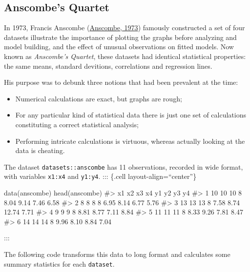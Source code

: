 \documentclass[
  letterpaper,
  10pt,
  krantz2]{krantz}
\makeatletter
\newenvironment{Shaded}{\begin{snugshade}}{\end{snugshade}}
\newcommand{\CommentTok}[1]{\textcolor[rgb]{0.37,0.37,0.37}{#1}}
\newcommand{\FunctionTok}[1]{\textcolor[rgb]{0.28,0.35,0.67}{#1}}
\newcommand{\NormalTok}[1]{\textcolor[rgb]{0.00,0.23,0.31}{#1}}
\providecommand{\tightlist}{%
  \setlength{\itemsep}{0pt}\setlength{\parskip}{0pt}}\usepackage{longtable,booktabs,array}
\newenvironment{kframe}{%
  \medskip{}
  \setlength{\fboxsep}{.8em}
  \def\at@end@of@kframe{}%
  \ifinner\ifhmode%
  \def\at@end@of@kframe{\end{minipage}}%
  \begin{minipage}{\columnwidth}%
  \fi\fi%
  \def\FrameCommand##1{\hskip\@totalleftmargin \hskip-\fboxsep
  \colorbox{shadecolor}{##1}\hskip-\fboxsep
      \hskip-\linewidth \hskip-\@totalleftmargin \hskip\columnwidth}%
  \MakeFramed {\advance\hsize-\width
    \@totalleftmargin\z@ \linewidth\hsize
    \@setminipage}}%
{\par\unskip\endMakeFramed%
  \at@end@of@kframe}
\renewenvironment{Shaded}{\begin{kframe}}{\end{kframe}}
\makeatother
\begin{document}
\hypertarget{sec-anscombe}{%
\subsection{Anscombe's Quartet}\label{sec-anscombe}}

In 1973, Francis Anscombe (\protect\hyperlink{ref-Anscombe:73}{Anscombe,
1973}) famously constructed a set of four datasets illustrate the
importance of plotting the graphs before analyzing and model building,
and the effect of unusual observations on fitted models. Now known as
\emph{Anscombe's Quartet}, these datasets had identical statistical
properties: the same means, standard devitions, correlations and
regression lines.

His purpose was to debunk three notions that had been prevalent at the
time:

\begin{itemize}
\tightlist
\item
  Numerical calculations are exact, but graphs are rough;
\item
  For any particular kind of statistical data there is just one set of
  calculations constituting a correct statistical analysis;
\item
  Performing intricate calculations is virtuous, whereas actually
  looking at the data is cheating.
\end{itemize}

The dataset \texttt{datasets::anscombe} has 11 observations, recorded in
wide format, with variables \texttt{x1:x4} and \texttt{y1:y4}. :::
\{.cell layout-align=``center''\}

\begin{Shaded}
\begin{Highlighting}[]
\FunctionTok{data}\NormalTok{(anscombe) }
\FunctionTok{head}\NormalTok{(anscombe)}
\CommentTok{\#\textgreater{}   x1 x2 x3 x4   y1   y2    y3   y4}
\CommentTok{\#\textgreater{} 1 10 10 10  8 8.04 9.14  7.46 6.58}
\CommentTok{\#\textgreater{} 2  8  8  8  8 6.95 8.14  6.77 5.76}
\CommentTok{\#\textgreater{} 3 13 13 13  8 7.58 8.74 12.74 7.71}
\CommentTok{\#\textgreater{} 4  9  9  9  8 8.81 8.77  7.11 8.84}
\CommentTok{\#\textgreater{} 5 11 11 11  8 8.33 9.26  7.81 8.47}
\CommentTok{\#\textgreater{} 6 14 14 14  8 9.96 8.10  8.84 7.04}
\end{Highlighting}
\end{Shaded}

:::

The following code transforms this data to long format and calculates
some summary statistics for each \texttt{dataset}.
\end{document}
